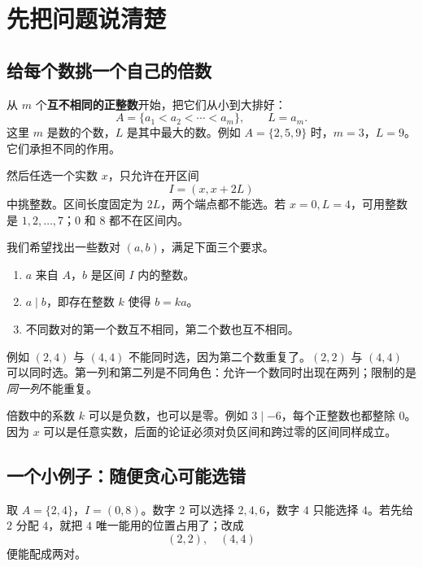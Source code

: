 \documentclass[UTF8,a4paper,oneside,openany,fontset=fandol,zihao=-4]{ctexbook}
\theoremstyle{guide}
\begin{document}
\clearpage
\tableofcontents
\clearpage
\mainmatter
\chapter{先把问题说清楚}
\section{给每个数挑一个自己的倍数}
从 $m$ 个\textbf{互不相同的正整数}开始，把它们从小到大排好：
\[
A=\{a_1<a_2<\cdots<a_m\},\qquad L=a_m.
\]
这里 $m$ 是数的个数，$L$ 是其中最大的数。例如 $A=\{2,5,9\}$ 时，$m=3$，$L=9$。它们承担不同的作用。

然后任选一个实数 $x$，只允许在开区间
\[
I=(x,x+2L)
\]
中挑整数。区间长度固定为 $2L$，两个端点都不能选。若 $x=0,L=4$，可用整数是 $1,2,\ldots,7$；$0$ 和 $8$ 都不在区间内。

我们希望找出一些数对 $(a,b)$，满足下面三个要求。
\begin{enumerate}
\item $a$ 来自 $A$，$b$ 是区间 $I$ 内的整数。
\item $a\mid b$，即存在整数 $k$ 使得 $b=ka$。
\item 不同数对的第一个数互不相同，第二个数也互不相同。
\end{enumerate}
例如 $(2,4)$ 与 $(4,4)$ 不能同时选，因为第二个数重复了。$(2,2)$ 与 $(4,4)$ 可以同时选。第一列和第二列是不同角色：允许一个数同时出现在两列；限制的是\emph{同一列}不能重复。

倍数中的系数 $k$ 可以是负数，也可以是零。例如 $3\mid-6$，每个正整数也都整除 $0$。因为 $x$ 可以是任意实数，后面的论证必须对负区间和跨过零的区间同样成立。

\section{一个小例子：随便贪心可能选错}
取 $A=\{2,4\}$，$I=(0,8)$。数字 $2$ 可以选择 $2,4,6$，数字 $4$ 只能选择 $4$。若先给 $2$ 分配 $4$，就把 $4$ 唯一能用的位置占用了；改成
\[
(2,2),\quad(4,4)
\]
便能配成两对。

\begin{center}
\end{center}
\end{document}
